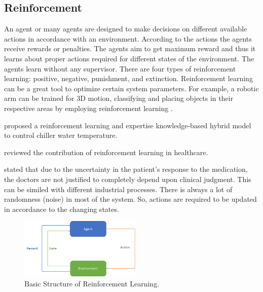 \documentclass[conference]{IEEEtran}
\begin{document}
\subsection{Reinforcement}
An agent or many agents are designed to make decisions on different available actions in accordance with an environment. According to the actions the agents receive rewards or penalties. The agents aim to get maximum reward and thus it learns about proper actions required for different states of the environment. The agents learn without any supervisor. There are four types of reinforcement learning: positive, negative, punishment, and extinction. Reinforcement learning can be a great tool to optimize certain system parameters. For example, a robotic arm can be trained for 3D motion, classifying and placing objects in their respective areas by employing reinforcement learning \cite{b3}.
\par
\cite{b4} proposed a reinforcement learning and expertise knowledge-based hybrid model to control chiller water temperature.
\par
\cite{b5} reviewed the contribution of reinforcement learning in healthcare.
\par
\cite{b6} stated that due to the uncertainty in the patient's response to the medication, the doctors are not justified to completely depend upon clinical judgment. This can be similed with different industrial processes. There is always a lot of randomness (noise) in most of the system. So, actions are required to be updated in accordance to the changing states.

\begin{figure}[htbp]
\centerline{\includegraphics[width=165pt]{images/rl.png}}
\caption{Basic Structure of Reinforcement Learning.}
\label{RL}
\end{figure}
\end{document}

